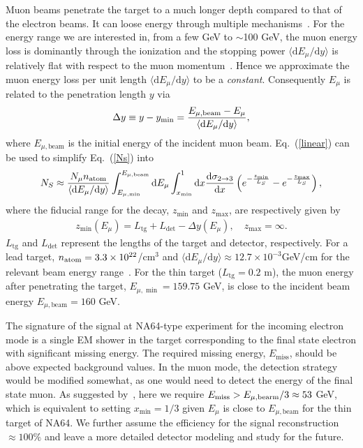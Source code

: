\documentclass[prd,onecolumn,notitlepage,
nofootinbib,aps,tightenlines,
preprintnumbers,amsmath,amssymb,amsfonts,showpacs,superscriptaddress]{revtex4-1}
\renewcommand{\eqref}[1]{Eq.~(\ref{#1})}
\newcommand{\beq}{\begin{equation}}
\newcommand{\eeq}{\end{equation}}
\renewcommand{\d}{\text{d}}
\newcommand{\be}{\begin{eqnarray}}
\newcommand{\ee}{\end{eqnarray}}
\renewcommand{\d}{\text{d}}
\begin{document}
Muon beams penetrate the target to a much longer depth compared to that of the electron beams.  It can loose energy through multiple mechanisms~\cite{Olive:2016xmw}. For the energy range we are interested in, from a few GeV to $\sim$100 GeV,  the muon energy loss is dominantly through the ionization and the stopping power $\langle \d E_\mu/\d y \rangle$  is relatively flat  with respect to the muon momentum~\cite{Olive:2016xmw}.  
Hence we approximate the muon energy loss per unit length $\langle \d E_\mu/\d y \rangle$ to be a \emph{constant}.  Consequently  $E_\mu$ is related to the penetration length $y$ via
\be
\Delta y \equiv y-y_{\min} ={E_{\mu, \text{beam}}-E_\mu \over \langle \d E_\mu/\d y \rangle},
\label{linear}
\ee
where $E_{\mu, \text{beam}}$ is the initial energy of the incident muon beam. \eqref{linear} can be used to simplify Eq.~(\ref{Ns}) into
\beq
N_S \approx  \frac{ N_\mu n_{\rm atom}}{\langle \d E_\mu/\d y \rangle} \int_{E_{\mu, \min}}^{E_{\mu, \text{beam}}} \d E_\mu  \int_{x_{\min}}^1 \d x  {\d\sigma_{2\to 3} \over \d x}  \left(e^{-{z_{\min}\over L_S}}-e^{-{z_{\max}\over L_S}}\right),
\label{simpleNs}
\eeq
where  the fiducial range for the decay, $z_{\min}$ and $z_{\max}$, are respectively given by 
\be
z_{\min} (E_\mu)= L_\text{tg}+L_\text{det} - \Delta y (E_\mu), \quad z_{\max} = \infty.
\ee
$L_\text{tg}$ and $L_\text{det}$ represent the lengths of the target and detector, respectively.  
For a lead target, $n_{\rm atom}=3.3\times 10^{22}$/cm$^3$ and $\langle \d E_\mu/\d y \rangle \approx 12.7\times 10^{-3}$GeV/cm for the relevant beam energy range~\cite{pdgmat}. For the thin target ($L_\text{tg}=0.2$ m), the muon energy after penetrating the target, $E_{\mu, \min}=159.75$ GeV, is close to the incident beam energy $E_{\mu, \text{beam}}=160$ GeV.  

The signature of the signal at NA64-type experiment for the incoming electron mode 
is a single EM shower in the target corresponding to the final state electron with significant missing energy. The required missing energy, $E_\text{miss}$, should be above expected background values. In the muon mode, the detection strategy would be modified somewhat, as one would need to detect the energy of the final state muon.  As suggested by~\cite{Gninenko:2014pea,Banerjee:2016tad}, here we require $E_{\rm miss} >E_{\mu,\rm bearm}/3\approx 53$ GeV, which is equivalent to setting $x_{\min}=1/3$ given $E_{\mu}$ is close to $E_{\mu, \text{beam}}$ for the thin target of NA64. We further assume the efficiency for the signal reconstruction $\approx 100\%$ and leave a more detailed detector modeling and study for the future.
\end{document}
